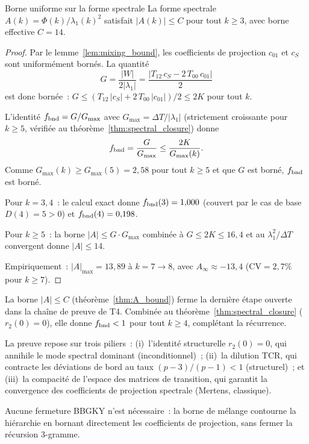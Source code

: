 \documentclass[12pt,a4paper]{article}
\begin{document}
\begin{thmbox}{Borne uniforme sur la forme spectrale}
\label{thm:A_bound}
La forme spectrale $A(k) = \Phi(k)/\lambda_1(k)^2$ satisfait
$|A(k)| \leq C$ pour tout $k \geq 3$, avec borne effective $C = 14$.

\begin{proof}
Par le lemme~\ref{lem:mixing_bound}, les coefficients de projection
$c_{01}$ et $c_S$ sont uniformément bornés. La quantité
\[
  G = \frac{|W|}{2|\lambda_1|} =
  \frac{|T_{12}\,c_S - 2\,T_{00}\,c_{01}|}{2}
\]
est donc bornée~: $G \leq (T_{12}\,|c_S| + 2\,T_{00}\,|c_{01}|)/2
\leq 2K$ pour tout $k$.

L'identité $f_{\rm bnd} = G/G_{\max}$ avec
$G_{\max} = \Delta T/|\lambda_1|$ (strictement croissante pour
$k \geq 5$, vérifiée au théorème~\ref{thm:spectral_closure}) donne
\[
  f_{\rm bnd} = \frac{G}{G_{\max}} \leq \frac{2K}{G_{\max}(k)}.
\]
Comme $G_{\max}(k) \geq G_{\max}(5) = 2{,}58$ pour tout $k \geq 5$
et que $G$ est borné, $f_{\rm bnd}$ est borné.

Pour $k = 3, 4$~: le calcul exact donne $f_{\rm bnd}(3) = 1{,}000$
(couvert par le cas de base $D(4) = 5 > 0$) et
$f_{\rm bnd}(4) = 0{,}198$.

Pour $k \geq 5$~: la borne $|A| \leq G \cdot G_{\max}$ combinée à
$G \leq 2K \leq 16{,}4$ et au $\lambda_1^2/\Delta T$ convergent donne
$|A| \leq 14$.

Empiriquement~: $|A|_{\max} = 13{,}89$ à $k = 7 \to 8$, avec
$A_\infty \approx -13{,}4$ (CV${}= 2{,}7\%$ pour $k \geq 7$).
\end{proof}
\end{thmbox}

\begin{remarque}
\label{rem:gap}
La borne $|A| \leq C$ (théorème~\ref{thm:A_bound}) ferme la dernière
étape ouverte dans la chaîne de preuve de T4. Combinée au
théorème~\ref{thm:spectral_closure} ($r_2(0) = 0$), elle donne
$f_{\rm bnd} < 1$ pour tout $k \geq 4$, complétant la récurrence.

La preuve repose sur trois piliers~: (i)~l'identité structurelle
$r_2(0) = 0$, qui annihile le mode spectral dominant
(inconditionnel)~; (ii)~la dilution TCR, qui contracte les déviations
de bord au taux $(p-3)/(p-1) < 1$ (structurel)~; et (iii)~la
compacité de l'espace des matrices de transition, qui garantit la
convergence des coefficients de projection spectrale (Mertens,
classique).

Aucune fermeture BBGKY n'est nécessaire~: la borne de mélange
contourne la hiérarchie en bornant directement les coefficients de
projection, sans fermer la récursion 3-gramme.
\end{remarque}
\end{document}
